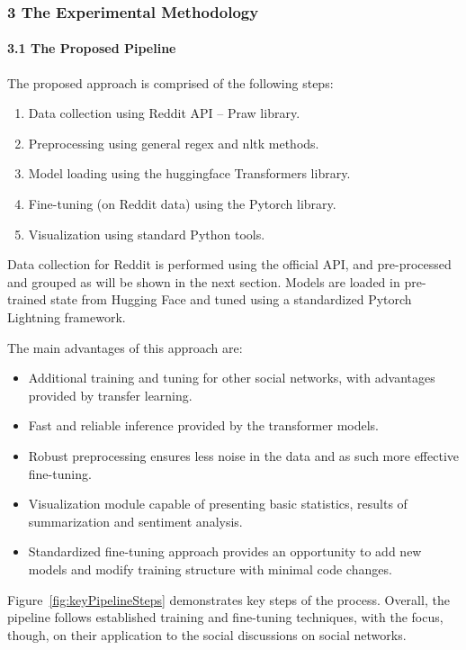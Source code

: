 \subsubsection{3 The Experimental Methodology}
\paragraph{3.1 The Proposed Pipeline}
The proposed approach is comprised of the following steps:

\begin{enumerate}
	\item Data collection using Reddit API -- Praw library.
	\item Preprocessing using general regex and nltk methods.
	\item Model loading using the huggingface Transformers library.
	\item Fine-tuning (on Reddit data) using the Pytorch library.
	\item Visualization using standard Python tools.
\end{enumerate}

Data collection for Reddit is performed using the official API, and pre-processed and
grouped as will be shown in the next section. Models are loaded in pre-trained state from Hugging Face and tuned using a standardized Pytorch Lightning framework.

The main advantages of this approach are:

\begin{itemize}
	\item Additional training and tuning for other social networks, with advantages provided by transfer learning.
	\item Fast and reliable inference provided by the transformer models.
	\item Robust preprocessing ensures less noise in the data and as such more effective
	fine-tuning.
	\item Visualization module capable of presenting basic statistics, results of summarization
	and sentiment analysis.
	\item Standardized fine-tuning approach provides an opportunity to add new models and
	modify training structure with minimal code changes.
\end{itemize}

Figure~\cref{fig:keyPipelineSteps} demonstrates key steps of the process. Overall, the pipeline follows established training and fine-tuning techniques, with the focus, though, on their application to the social discussions on social networks.

